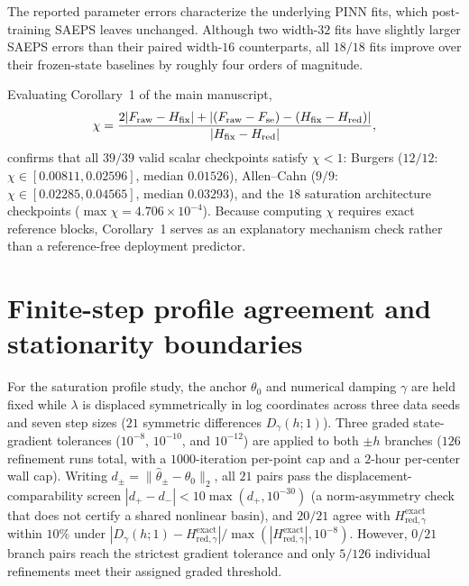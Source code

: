 \documentclass[10pt,letterpaper]{article}
\newcommand{\Hred}{H_{\mathrm{red},\gamma}^{\mathrm{exact}}}
\begin{document}


The reported parameter errors characterize the underlying PINN fits, which post-training SAEPS leaves unchanged.
Although two width-$32$ fits have slightly larger SAEPS errors than their paired width-$16$ counterparts, all $18/18$ fits improve over their frozen-state baselines by roughly four orders of magnitude.

Evaluating Corollary~1 of the main manuscript,
\begin{equation}
 \chi=\frac{2|F_{\rm raw}-H_{\rm fix}|+
 |(F_{\rm raw}-F_{\rm se})-(H_{\rm fix}-H_{\rm red})|}
 {|H_{\rm fix}-H_{\rm red}|},
\end{equation}
confirms that all $39/39$ valid scalar checkpoints satisfy $\chi<1$:
Burgers ($12/12$: $\chi\in[0.00811,0.02596]$, median $0.01526$),
Allen--Cahn ($9/9$: $\chi\in[0.02285,0.04565]$, median $0.03293$),
and the $18$ saturation architecture checkpoints ($\max\chi=4.706\times10^{-4}$).
Because computing $\chi$ requires exact reference blocks, Corollary~1 serves as an explanatory mechanism check rather than a reference-free deployment predictor.

\section{Finite-step profile agreement and stationarity boundaries}
For the saturation profile study, the anchor $\theta_0$ and numerical damping $\gamma$ are held fixed while $\lambda$ is displaced symmetrically in log coordinates across three data seeds and seven step sizes ($21$ symmetric differences $D_\gamma(h;1)$).
Three graded state-gradient tolerances ($10^{-8}$, $10^{-10}$, and $10^{-12}$) are applied to both $\pm h$ branches ($126$ refinement runs total, with a $1000$-iteration per-point cap and a $2\text{-hour}$ per-center wall cap).
Writing $d_\pm=\|\widehat\theta_\pm-\theta_0\|_2$, all $21$ pairs pass the displacement-comparability screen $|d_+-d_-|<10\max(d_+,10^{-30})$ (a norm-asymmetry check that does not certify a shared nonlinear basin), and $20/21$ agree with $\Hred$ within $10\%$ under $|D_\gamma(h;1)-\Hred|/\max(|\Hred|,10^{-8})$.
However, $0/21$ branch pairs reach the strictest gradient tolerance and only $5/126$ individual refinements meet their assigned graded threshold.

\end{document}
